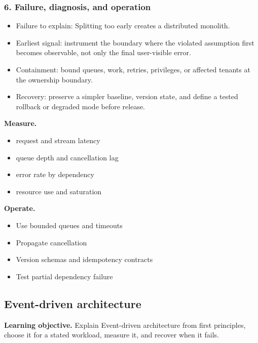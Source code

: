 \subsubsection*{6. Failure, diagnosis, and operation}
\begin{itemize}
\item Failure to explain: Splitting too early creates a distributed monolith.
\item Earliest signal: instrument the boundary where the violated assumption first becomes observable, not only the final user-visible error.
\item Containment: bound queues, work, retries, privileges, or affected tenants at the ownership boundary.
\item Recovery: preserve a simpler baseline, version state, and define a tested rollback or degraded mode before release.
\end{itemize}
\textbf{Measure.}\begin{itemize}
\item request and stream latency
\item queue depth and cancellation lag
\item error rate by dependency
\item resource use and saturation
\end{itemize}
\textbf{Operate.}\begin{itemize}
\item Use bounded queues and timeouts
\item Propagate cancellation
\item Version schemas and idempotency contracts
\item Test partial dependency failure
\end{itemize}
\subsection{Event-driven architecture}
\textbf{Learning objective.} Explain Event-driven architecture from first principles, choose it for a stated workload, measure it, and recover when it fails.
